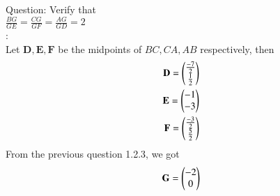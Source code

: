\documentclass[journal,12pt,onecolumn]{IEEEtran}
\theoremstyle{remark}
\begin{document}
\let\vec\mathbf




\vspace{3cm}



\bigskip

\renewcommand{\thefigure}{\theenumi}
\renewcommand{\thetable}{\theenumi}
Question: Verify that\\
$\frac{BG}{GE}=\frac{CG}{GF}=\frac{AG}{GD}=2$
\\ \solution:\\
Let $\vec{D},\vec{E},\vec{F}$ be the midpoints of $BC,CA,AB$ respectively, then
\begin{align}
\vec{D} = \myvec{\frac{-7}{2}\\\frac{1}{2}}\\
\vec{E} = \myvec{-1\\-3}\\
\vec{F} = \myvec{\frac{-3}{2}\\\frac{5}{2}}
\end{align}
From the previous question 1.2.3, we got
\begin{align}
\vec{G}=\myvec{-2\\0}
\end{align}
\end{document}
